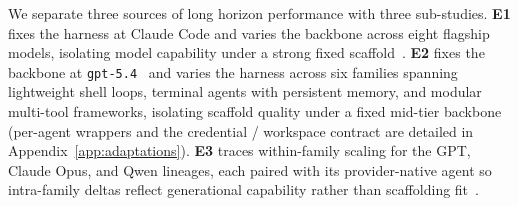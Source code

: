 We separate three sources of long horizon performance with three sub-studies.
\textbf{E1} fixes the harness at Claude Code and varies the backbone across eight flagship models, isolating model capability under a strong fixed scaffold~\citep{anthropic_opus47,openai_gpt55,zhipu_glm51,deepseek_v4_pro,google_gemini31_pro,qwen36_plus,moonshot_kimi_k26,xai_grok41_fast_reasoning}.
\textbf{E2} fixes the backbone at \texttt{gpt-5.4}~\citep{openai_gpt54} and varies the harness across six families spanning lightweight shell loops, terminal agents with persistent memory, and modular multi-tool frameworks, isolating scaffold quality under a fixed mid-tier backbone (per-agent wrappers and the credential / workspace contract are detailed in Appendix~\ref{app:adaptations}).
\textbf{E3} traces within-family scaling for the GPT, Claude Opus, and Qwen lineages, each paired with its provider-native agent so intra-family deltas reflect generational capability rather than scaffolding fit~\citep{openai_gpt4o_system_card,openai_gpt5,openai_gpt52_system_card,openai_gpt55,anthropic_claude4_system_card,anthropic_sonnet45,anthropic_opus45,anthropic_opus47,qwen25_technical_report,qwen3max,qwen35_plus,qwen36_plus}.
